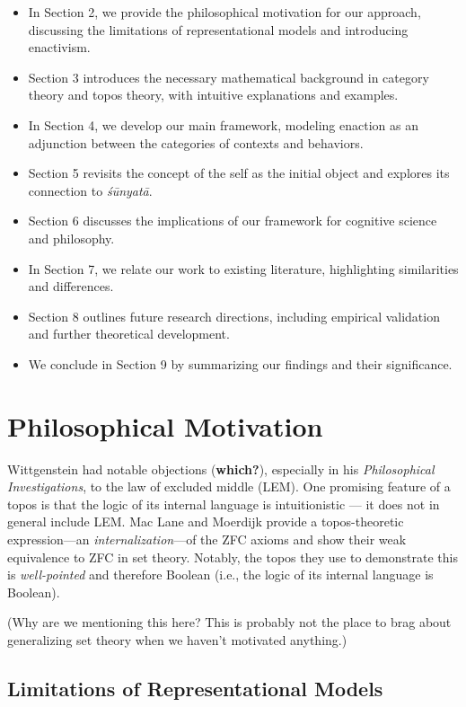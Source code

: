 \documentclass{article}
\begin{document}
\begin{itemize}
    \item In Section 2, we provide the philosophical motivation for our approach, discussing the limitations of representational models and introducing enactivism.
    \item Section 3 introduces the necessary mathematical background in category theory and topos theory, with intuitive explanations and examples.
    \item In Section 4, we develop our main framework, modeling enaction as an adjunction between the categories of contexts and behaviors.
    \item Section 5 revisits the concept of the self as the initial object and explores its connection to \emph{śūnyatā}.
    \item Section 6 discusses the implications of our framework for cognitive science and philosophy.
    \item In Section 7, we relate our work to existing literature, highlighting similarities and differences.
    \item Section 8 outlines future research directions, including empirical validation and further theoretical development.
    \item We conclude in Section 9 by summarizing our findings and their significance.
\end{itemize}




\section{Philosophical Motivation}

Wittgenstein had notable objections (\textbf{which?}), especially in his \emph{Philosophical Investigations}, to the law of excluded middle (LEM). One promising feature of a topos is that the logic of its internal language is intuitionistic --- it does not in general include LEM. Mac Lane and Moerdijk provide a topos-theoretic expression---an \emph{internalization}---of the ZFC axioms and show their weak equivalence to ZFC in set theory. Notably, the topos they use to demonstrate this is \emph{well-pointed} and therefore Boolean (i.e., the logic of its internal language is Boolean).

(Why are we mentioning this here? This is probably not the place to brag about generalizing set theory when we haven't motivated anything.)

\subsection{Limitations of Representational Models}
\end{document}

